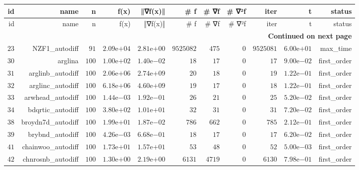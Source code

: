 \documentclass[varwidth=20cm,crop=true]{standalone}
\begin{document}
\begin{longtable}{rrrrrrrrrrr}
  \hline
  id & name & n & f(x) & ‖∇f(x)‖ & # f & # ∇f & # ∇²f & iter & t & status \\\hline
  \endfirsthead
  \hline
  id & name & n & f(x) & ‖∇f(x)‖ & # f & # ∇f & # ∇²f & iter & t & status \\\hline
  \endhead
  \hline
  \multicolumn{11}{r}{{\bfseries Continued on next page}}\\
  \hline
  \endfoot
  \endlastfoot
  \(    23\) & NZF1\_autodiff & \(    91\) & \( 2.09\)e\(+04\) & \( 2.81\)e\(+00\) & \(9525082\) & \(   475\) & \(     0\) & \(9525081\) & \( 6.00\)e\(+01\) & max\_time \\
  \(    30\) & arglina & \(   100\) & \( 1.00\)e\(+02\) & \( 1.40\)e\(-02\) & \(    18\) & \(    17\) & \(     0\) & \(    17\) & \( 9.00\)e\(-02\) & first\_order \\
  \(    31\) & arglinb\_autodiff & \(   100\) & \( 2.06\)e\(+06\) & \( 2.74\)e\(+09\) & \(    20\) & \(    18\) & \(     0\) & \(    19\) & \( 1.22\)e\(-01\) & first\_order \\
  \(    32\) & arglinc\_autodiff & \(   100\) & \( 6.18\)e\(+06\) & \( 4.60\)e\(+09\) & \(    19\) & \(    17\) & \(     0\) & \(    18\) & \( 1.22\)e\(-01\) & first\_order \\
  \(    33\) & arwhead\_autodiff & \(   100\) & \( 1.44\)e\(-03\) & \( 1.92\)e\(-01\) & \(    26\) & \(    21\) & \(     0\) & \(    25\) & \( 5.20\)e\(-02\) & first\_order \\
  \(    34\) & bdqrtic\_autodiff & \(   100\) & \( 3.80\)e\(+02\) & \( 1.01\)e\(+01\) & \(    32\) & \(    31\) & \(     0\) & \(    31\) & \( 7.20\)e\(-02\) & first\_order \\
  \(    38\) & broydn7d\_autodiff & \(   100\) & \( 1.99\)e\(+01\) & \( 1.87\)e\(-02\) & \(   786\) & \(   662\) & \(     0\) & \(   785\) & \( 2.12\)e\(-01\) & first\_order \\
  \(    39\) & brybnd\_autodiff & \(   100\) & \( 4.26\)e\(-03\) & \( 6.68\)e\(-01\) & \(    18\) & \(    17\) & \(     0\) & \(    17\) & \( 6.20\)e\(-02\) & first\_order \\
  \(    41\) & chainwoo\_autodiff & \(   100\) & \( 1.73\)e\(+01\) & \( 1.57\)e\(+01\) & \(    53\) & \(    48\) & \(     0\) & \(    52\) & \( 5.00\)e\(-03\) & first\_order \\
  \(    42\) & chnrosnb\_autodiff & \(   100\) & \( 1.30\)e\(+00\) & \( 2.19\)e\(+00\) & \(  6131\) & \(  4719\) & \(     0\) & \(  6130\) & \( 7.98\)e\(-01\) & first\_order \\

\end{longtable}
\end{document}
